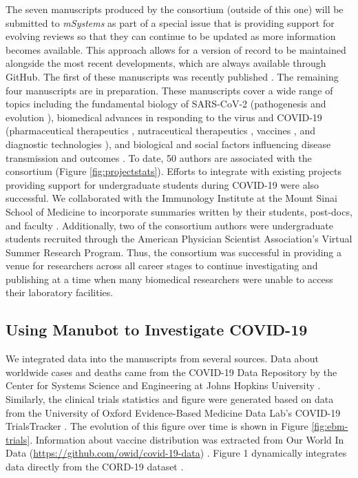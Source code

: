 \documentclass[twocolumn]{ceurart}
\begin{document}
The seven manuscripts produced by the consortium (outside of this one) will be submitted to \emph{mSystems} as part of a special issue that is providing support for evolving reviews so that they can continue to be updated as more information becomes available.
This approach allows for a version of record to be maintained alongside the most recent developments, which are always available through GitHub.
The first of these manuscripts was recently published \citep{q3PU2Eno}.
The remaining four manuscripts are in preparation.
These manuscripts cover a wide range of topics including the fundamental biology of SARS-CoV-2 (pathogenesis \citep{r366f5T3} and evolution \citep{17qiILENK}), biomedical advances in responding to the virus and COVID-19 (pharmaceutical therapeutics \citep{cifK9B8t}, nutraceutical therapeutics \citep{q3PU2Eno}, vaccines \citep{i2CGFwI3}, and diagnostic technologies \citep{m8bOfc0M}), and biological and social factors influencing disease transmission and outcomes \citep{Up1vB19z}.
To date, 50 authors are associated with the consortium (Figure \ref{fig:projectstats}).
Efforts to integrate with existing projects providing support for undergraduate students during COVID-19 were also successful.
We collaborated with the Immunology Institute at the Mount Sinai School of Medicine to incorporate summaries written by their students, post-docs, and faculty \citep{cYo4O2qX, YZ4cHNuH}.
Additionally, two of the consortium authors were undergraduate students recruited through the American Physician Scientist Association's Virtual Summer Research Program.
Thus, the consortium was successful in providing a venue for researchers across all career stages to continue investigating and publishing at a time when many biomedical researchers were unable to access their laboratory facilities.

\hypertarget{using-manubot-to-investigate-covid-19}{%
\subsection{Using Manubot to Investigate COVID-19}\label{using-manubot-to-investigate-covid-19}}

We integrated data into the manuscripts from several sources.
Data about worldwide cases and deaths came from the COVID-19 Data Repository by the Center for Systems Science and Engineering at Johns Hopkins University \citep{MrwDDw9R}.
Similarly, the clinical trials statistics and figure were generated based on data from the University of Oxford Evidence-Based Medicine Data Lab's COVID-19 TrialsTracker \citep{SSbnPnzT}.
The evolution of this figure over time is shown in Figure \ref{fig:ebm-trials}.
Information about vaccine distribution was extracted from Our World In Data (\url{https://github.com/owid/covid-19-data}) \citep{ZHvhFakW}.
Figure 1 dynamically integrates data directly from the CORD-19 dataset \citep{CiOwklc6}.
\end{document}
